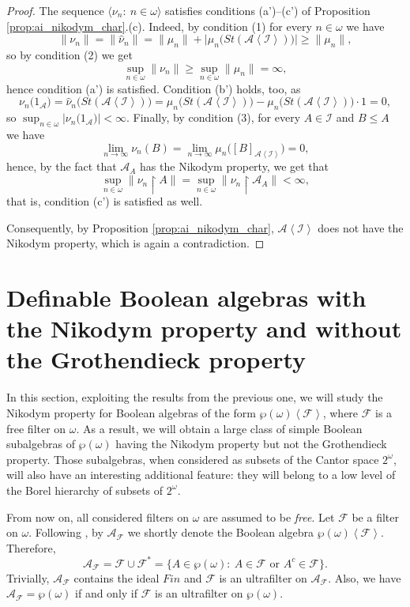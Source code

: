 \documentclass[a4paper,11pt,fleqn]{amsart}
\theoremstyle{definition}
\theoremstyle{remark}
\numberwithin{equation}{section}
\newcommand{\N}{\mathbb{N}}
\newcommand{\aA}{\mathcal{A}}
\newcommand{\fF}{\mathcal{F}}
\newcommand{\iI}{\mathcal{I}}
\newcommand{\rstr}{\restriction}
\newcommand{\wh}{\widehat}
\newcommand{\seqn}[1]{\big\langle#1\colon\ n\io\big\rangle}
\newcommand{\gen}[1]{\mathopen{}\left\langle#1\mathclose{}\right\rangle}
\newcommand{\clopen}[1]{\left[#1\right]}
\newcommand{\io}{\in\omega}%
\newcommand{\wo}{{\wp(\omega)}}%
\newcommand{\Cantor}{2^\omega}
\begin{document}
\begin{proof}
The sequence $\seqn{\nu_n}$ satisfies conditions (a')--(c') of Proposition \ref{prop:ai_nikodym_char}.(c). Indeed, by condition (1) for every $n\io$ we have 
\[\big\|\nu_n\big\|=\big\|\wh{\nu}_n\big\|=\big\|\mu_n\big\|+\big|\mu_n\big(St(\aA\gen{\iI})\big)\big|\ge\big\|\mu_n\big\|,\]
so by condition (2) we get
\[\sup_{n\io}\big\|\nu_n\big\|\ge\sup_{n\io}\big\|\mu_n\big\|=\infty,\]
hence condition (a') is satisfied. Condition (b') holds, too, as
\[\nu_n\big(1_\aA\big)=\wh{\nu}_n\big(St(\aA\gen{\iI})\big)=\mu_n\big(St(\aA\gen{\iI})\big)-\mu_n\big(St(\aA\gen{\iI})\big)\cdot1=0,\]
so $\sup_{n\io}\big|\nu_n\big(1_\aA\big)\big|<\infty$. Finally, by condition (3), for every $A\in\iI$ and $B\le A$ we have
\[\lim_{n\to\infty}\nu_n(B)=\lim_{n\to\infty}\mu_n\big(\clopen{B}_{\aA\gen{\iI}}\big)=0,\]
hence, by the fact that $\aA_A$ has the Nikodym property, we get that
\[\sup_{n\io}\big\|\nu_n\rstr A\big\|=\sup_{n\io}\big\|\nu_n\rstr\aA_A\big\|<\infty,\]
that is, condition (c') is satisfied as well.

Consequently, by Proposition \ref{prop:ai_nikodym_char}, $\aA\gen{\iI}$ does not have the Nikodym property, which is again a contradiction.
\end{proof}

\section{Definable Boolean algebras with the Nikodym property and without the Grothendieck property\label{sec:definable}}

In this section, exploiting the results from the previous one, we will study the Nikodym property for Boolean algebras of the form $\wo\gen{\fF}$, where $\fF$ is a free filter on $\omega$. As a result, we will obtain a large class of simple Boolean subalgebras of $\wo$ having the Nikodym property but not the Grothendieck property. Those subalgebras, when considered as subsets of the Cantor space $\Cantor$, will also have an interesting additional feature: they will belong to a low level of the Borel hierarchy of subsets of $\Cantor$.

\medskip

From now on, all considered filters on $\omega$ are assumed to be \textit{free}. Let $\fF$ be a filter on $\omega$. Following \cite[Section 3]{MS24}, by $\aA_{\fF}$ we shortly denote the Boolean algebra $\wo\gen{\fF}$. Therefore,
\[\aA_{\fF}=\fF\cup\fF^*=\big\{A\in\wo\colon\ A\in \fF\text{ or }A^c\in \fF\big\}.\]
Trivially, $\aA_{\fF}$ contains the ideal $Fin$ and $\fF$ is an ultrafilter on $\aA_{\fF}$. Also, we have $\aA_{\fF}=\wo$ if and only if $\fF$ is an ultrafilter on $\wo$. 
\end{document}
